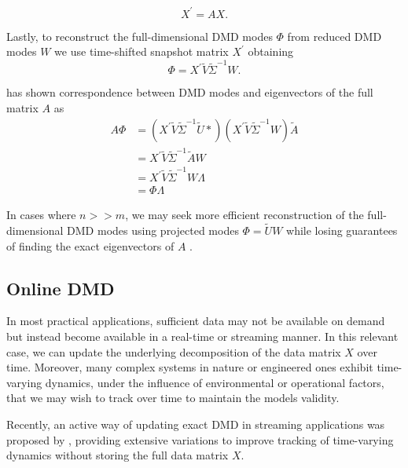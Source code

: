 \begin{equation*}
	X^\prime = AX.
\end{equation*}

Lastly, to reconstruct the full-dimensional DMD modes \(\Phi \) from reduced DMD modes \(W\) we use time-shifted snapshot matrix \(X^\prime \) obtaining
\begin{equation}\label{eq:full-dmd-modes}
	\Phi = X^\prime \tilde{V} \tilde{\Sigma}^{-1} W.
\end{equation}

\citet{Tu2013} has shown correspondence between DMD modes and eigenvectors of the full matrix \(A\) as
\begin{align*}
	A\Phi
	 & = (X^\prime \tilde{V} \tilde{\Sigma}^{-1} \tilde{U}*) (X^\prime \tilde{V} \tilde{\Sigma}^{-1} W)
	\tilde{A}                                                                                           \\
	 & = X^\prime \tilde{V} \tilde{\Sigma}^{-1} \tilde{A} W                                             \\
	 & = X^\prime \tilde{V} \tilde{\Sigma}^{-1} W \Lambda                                               \\
	 & = \Phi \Lambda
\end{align*}

In cases where \(n >> m\), we may seek more efficient reconstruction of the full-dimensional DMD modes using projected modes \(\Phi = \tilde{U} W\) while losing guarantees of finding the exact eigenvectors of \(A\) \citep{Schmid2010}.

\subsection{Online DMD}
In most practical applications, sufficient data may not be available on demand but instead become available in a real-time or streaming manner. In this relevant case, we can update the underlying decomposition of the data matrix \(X\) over time. Moreover, many complex systems in nature or engineered ones exhibit time-varying dynamics, under the influence of environmental or operational factors, that we may wish to track over time to maintain the models validity.

Recently, an active way of updating exact DMD in streaming applications was proposed by \citet{Zhang2019}, providing extensive variations to improve tracking of time-varying dynamics without storing the full data matrix \(X\).

